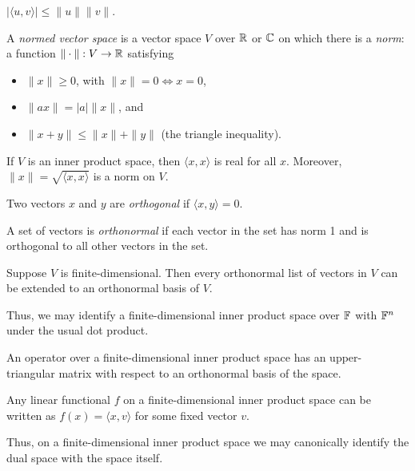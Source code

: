 \begin{prop}
  $|\langle u,v\rangle|\le \|u\|\|v\|$.
\end{prop}
\begin{defn}
  A \emph{normed vector space} is a vector space $V$ over $\mathbb{R}$ or $\mathbb{C}$
  on which there is a \emph{norm}: a function $\|\cdot\|:V\to\mathbb{R}$ satisfying
  \begin{itemize}
    \item $\| x\|\ge 0$, with $\|x\|=0\iff x=0$,
    \item $\|a x\|=|a|\| x\|$, and
    \item $\| x+ y\|\le\| x\|+\| y\|$ (the triangle
      inequality).
  \end{itemize}
\end{defn}
\begin{prop}
  If $V$ is an inner product space, then $\langle x, x\rangle$ is
  real for all $ x$.
  Moreover, $\| x\|=\sqrt{\langle x, x\rangle}$ is a norm
  on $V$.
\end{prop}
\begin{defn}
  Two vectors $ x$ and $ y$ are \emph{orthogonal} if $\langle
   x, y\rangle=0$.

  A set of vectors is \emph{orthonormal} if each vector in the set has norm 1
  and is orthogonal to all other vectors in the set.
\end{defn}
\begin{prop}
  Suppose $V$ is finite-dimensional. Then every orthonormal list of vectors in
  $V$ can be extended to an orthonormal basis of $V$.
\end{prop}
\begin{rem}
  Thus, we may identify a finite-dimensional inner product space over $\mathbb{F}$ with
  $\mathbb{F}^n$ under the usual dot product.
\end{rem}
\begin{thm}[Schur]
  An operator over a finite-dimensional inner product space has an
  upper-triangular matrix with respect to an orthonormal basis of the space.
\end{thm}
\begin{thm}
  Any linear functional $f$ on a finite-dimensional inner product space can be
  written as $f(x)=\langle x,v\rangle$ for some fixed vector $v$.
\end{thm}
\begin{rem}
  Thus, on a finite-dimensional inner product space we may canonically identify
  the dual space with the space itself.
\end{rem}
